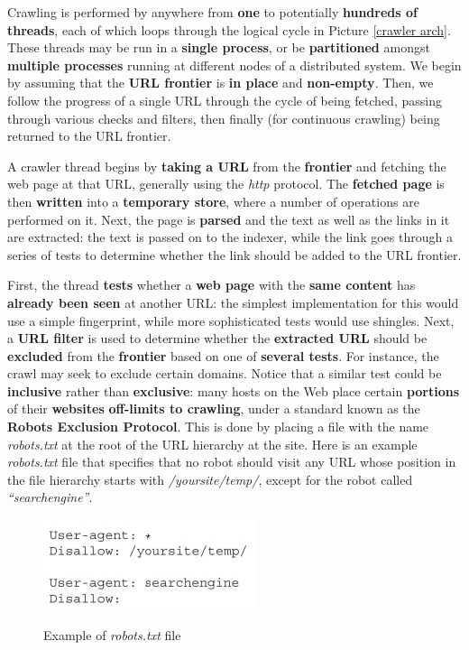 Crawling is performed by anywhere from \textbf{one} to potentially \textbf{hundreds of threads}, each of which loops through the logical cycle in Picture \ref{crawler arch}. These threads may be run in a \textbf{single process}, or be \textbf{partitioned} amongst \textbf{multiple processes} running at different nodes of a distributed system. We begin by assuming that the \textbf{URL frontier} is \textbf{in place} and \textbf{non-empty}. Then, we follow the progress of a single URL through the cycle of being fetched, passing through various checks and filters, then finally (for continuous crawling) being returned to the URL frontier. 

A crawler thread begins by \textbf{taking a URL} from the \textbf{frontier} and fetching the web page at that URL, generally using the \textit{http} protocol. The \textbf{fetched page} is then \textbf{written} into a \textbf{temporary store}, where a number of operations are performed on it. Next, the page is \textbf{parsed} and the text as well as the links in it are extracted: the text is passed on to the indexer, while the link goes through a series of tests to determine whether the link should be added to the URL frontier. 

First, the thread \textbf{tests} whether a \textbf{web page} with the \textbf{same content} has \textbf{already been seen} at another URL: the simplest implementation for this would use a simple fingerprint, while more sophisticated tests would use shingles. Next, a \textbf{URL filter} is used to determine whether the \textbf{extracted URL} should be \textbf{excluded} from the \textbf{frontier} based on one of \textbf{several tests}. For instance, the crawl may seek to exclude certain domains. Notice that a similar test could be \textbf{inclusive} rather than \textbf{exclusive}: many hosts on the Web place certain \textbf{portions} of their \textbf{websites} \textbf{off-limits to crawling}, under a standard known as the \textbf{Robots Exclusion Protocol}. This is done by placing a file with the name \textit{robots.txt} at the root of the URL hierarchy at the site. Here is an example\textit{ robots.txt} file that specifies that no robot should visit any URL whose position in the file hierarchy starts with \textit{/yoursite/temp/}, except for the robot called \textit{“searchengine”}.

\begin{figure}[h!]
		\centering
		\includegraphics[scale = 1.8]{img/robots.jpg}
		\label{robots}
        \caption{Example of \textit{robots.txt} file}
\end{figure}

